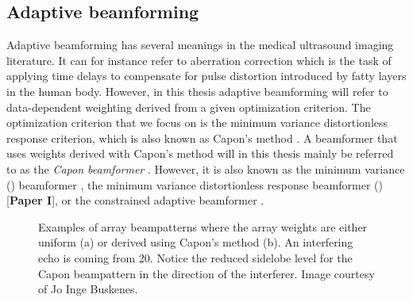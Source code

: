 \subsection{Adaptive beamforming}\label{sec:adaptbf}
Adaptive beamforming has several meanings in the medical ultrasound imaging literature. It can for instance refer to aberration correction \cite{cole1996method} which is the task of applying time delays to compensate for pulse distortion introduced by fatty layers in the human body. However, in this thesis adaptive beamforming will refer to data-dependent weighting derived from a given optimization criterion. The optimization criterion that we focus on is the minimum variance distortionless response criterion, which is also known as Capon's method \cite{Capon1969}. A beamformer that uses weights derived with Capon's method will in this thesis mainly be referred to as the \textit{Capon beamformer} \cite{Vignon2008}. However, it is also known as the minimum variance  () beamformer \cite{Synnevag2007}, the minimum variance distortionless response beamformer () [\textbf{Paper I}], or the constrained adaptive beamformer \cite{Mann2002}.

\begin{figure}[t!]
\caption{Examples of array beampatterns where the array weights are either uniform (a) or derived using Capon's method (b). An interfering echo is coming from 20\degree. Notice the reduced sidelobe level for the Capon beampattern in the direction of the interferer. Image courtesy of Jo Inge Buskenes.}
\label{fig:weights}
\end{figure}

